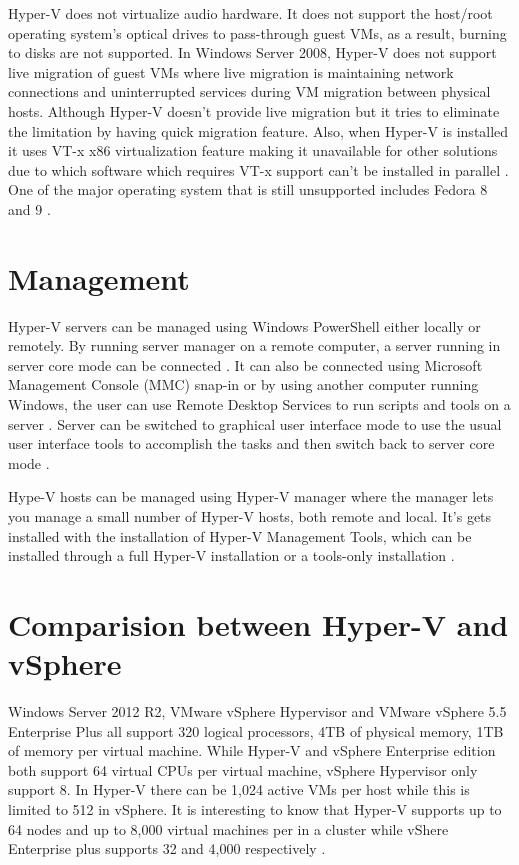 \documentclass[9pt,twocolumn,twoside]{../../styles/osajnl}
\begin{document}
Hyper-V does not virtualize audio hardware. It does not support the
host/root operating system's optical drives to pass-through guest VMs,
as a result, burning to disks are not supported. In Windows Server
2008, Hyper-V does not support live migration of guest VMs where live
migration is maintaining network connections and uninterrupted
services during VM migration between physical hosts. Although Hyper-V
doesn't provide live migration but it tries to eliminate the
limitation by having quick migration feature. Also, when Hyper-V is
installed it uses VT-x x86 virtualization feature making it
unavailable for other solutions due to which software which requires
VT-x support can't be installed in parallel
\cite{www-hyperv-wikipedia}. One of the major operating system that is
still unsupported includes Fedora 8 and 9 \cite{www-hyperv-wikipedia}.

\section{Management}

Hyper-V servers can be managed using Windows PowerShell either locally
or remotely. By running server manager on a remote computer, a server
running in server core mode can be connected
\cite{www-microsoft-technet}. It can also be connected using Microsoft
Management Console (MMC) snap-in or by using another computer running
Windows, the user can use Remote Desktop Services to run scripts and
tools on a server \cite{www-microsoft-technet}. Server can be switched
to graphical user interface mode to use the usual user interface tools
to accomplish the tasks and then switch back to server core mode
\cite{www-microsoft-technet}.

Hype-V hosts can be managed using Hyper-V manager where the manager
lets you manage a small number of Hyper-V hosts, both remote and
local. It's gets installed with the installation of Hyper-V Management
Tools, which can be installed through a full Hyper-V installation or a
tools-only installation \cite{www-microsoft-technet}.

\section{Comparision between Hyper-V and vSphere}

Windows Server 2012 R2, VMware vSphere Hypervisor and VMware vSphere
5.5 Enterprise Plus all support 320 logical processors, 4TB of
physical memory, 1TB of memory per virtual machine. While Hyper-V and
vSphere Enterprise edition both support 64 virtual CPUs per virtual
machine, vSphere Hypervisor only support 8. In Hyper-V there can be
1,024 active VMs per host while this is limited to 512 in vSphere. It
is interesting to know that Hyper-V supports up to 64 nodes and up to
8,000 virtual machines per in a cluster while vShere Enterprise plus
supports 32 and 4,000 respectively \cite{www-hyperv-paper}.
\end{document}
